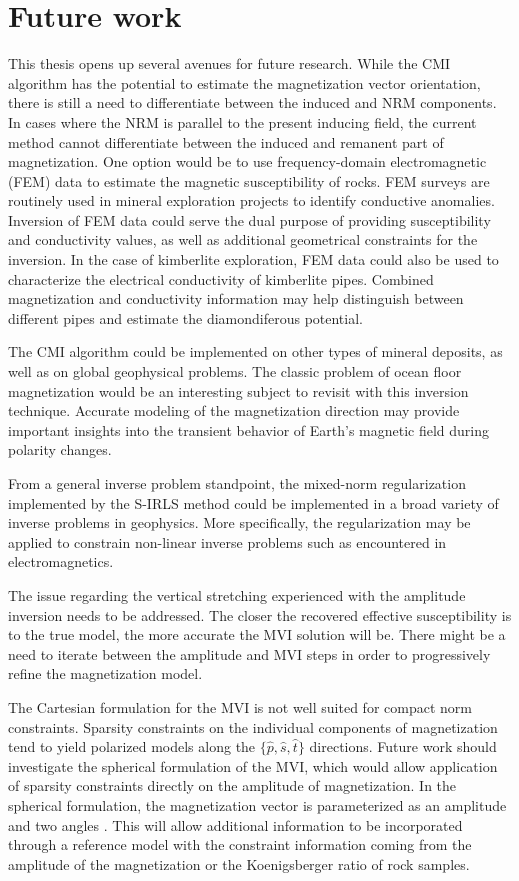 \section{Future work}
This thesis opens up several avenues for future research.
While the CMI algorithm has the potential to estimate the magnetization vector orientation, there is still a need to differentiate between the induced and NRM components. In cases where the NRM is parallel to the present inducing field, the current method cannot differentiate between the induced and remanent part of magnetization.
One option would be to use frequency-domain electromagnetic (FEM) data to estimate the magnetic susceptibility of rocks. FEM surveys are routinely used in mineral exploration projects to identify conductive anomalies. Inversion of FEM data could serve the dual purpose of providing susceptibility and conductivity values, as well as additional geometrical constraints for the inversion. In the case of kimberlite exploration, FEM data could also be used to characterize the electrical conductivity of kimberlite pipes. Combined magnetization and conductivity information may help distinguish between different pipes and estimate the diamondiferous potential.

The CMI algorithm could be implemented on other types of mineral deposits, as well as on global geophysical problems. 
The classic problem of ocean floor magnetization would be an interesting subject to revisit with this inversion technique. Accurate modeling of the magnetization direction may provide important insights into the transient behavior of Earth's magnetic field during polarity changes.

From a general inverse problem standpoint, the mixed-norm regularization implemented by the S-IRLS method could be implemented in a broad variety of inverse problems in geophysics.
More specifically, the regularization may be applied to constrain non-linear inverse problems such as encountered in electromagnetics.

The issue regarding the vertical stretching experienced with the amplitude inversion needs to be addressed.
The closer the recovered effective susceptibility is to the true model, the more accurate the MVI solution will be.
There might be a need to iterate between the amplitude and MVI steps in order to progressively refine the magnetization model.

The Cartesian formulation for the MVI is not well suited for compact norm constraints. Sparsity constraints on the individual components of magnetization tend to yield polarized models along the  $\{\hat p, \hat s, \hat t \}$ directions. Future work should investigate the spherical formulation of the MVI, which would allow application of sparsity constraints directly on the amplitude of magnetization.
In the spherical formulation, the magnetization vector is parameterized as an amplitude and two angles \cite[]{Lelievre2009}. This will allow additional information to be incorporated through a reference model with the constraint information coming from the amplitude of the magnetization or the Koenigsberger ratio of rock samples.   

